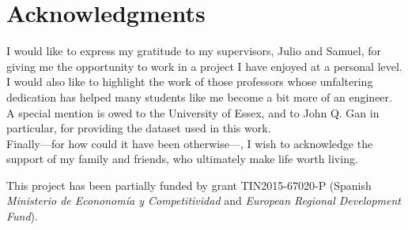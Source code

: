 
\begingroup
\chapter*{Acknowledgments}

I would like to express my gratitude to my supervisors, Julio and Samuel, for giving me the opportunity to work in a project I have enjoyed at a personal level. \\

I would also like to highlight the work of those professors whose unfaltering dedication has helped many students like me become a bit more of an engineer. \\

A special mention is owed to the University of Essex, and to John Q. Gan in particular, for providing the dataset used in this work. \\

Finally---for how could it have been otherwise---, I wish to acknowledge the support of my family and friends, who ultimately make life worth living.

\vfill

This project has been partially funded by grant TIN2015-67020-P (Spanish \textit{Ministerio de Econonomía y Competitividad} and \textit{European Regional Development Fund}).

\endgroup
